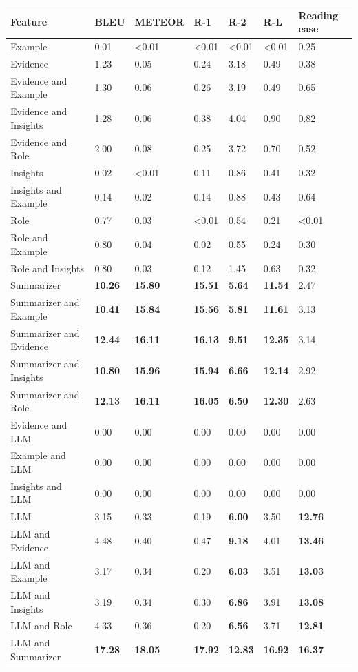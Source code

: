 \begin{tabular}{|l|l|l|l|l|l|l|}
\hline
\textbf{Feature} & BLEU & METEOR & R-1 & R-2 & R-L & Reading ease \\
 \hline
 Example & 0.01 & \textless{}0.01 & \textless{}0.01 & \textless{}0.01 & \textless{}0.01 & 0.25 \\
 \hline
 Evidence & 1.23 & 0.05 & 0.24 & 3.18 & 0.49 & 0.38 \\
 \hline
 Evidence and Example & 1.30 & 0.06 & 0.26 & 3.19 & 0.49 & 0.65 \\
 \hline
 Evidence and Insights & 1.28 & 0.06 & 0.38 & 4.04 & 0.90 & 0.82 \\
 \hline
 Evidence and Role & 2.00 & 0.08 & 0.25 & 3.72 & 0.70 & 0.52 \\
 \hline
 Insights & 0.02 & \textless{}0.01 & 0.11 & 0.86 & 0.41 & 0.32 \\
 \hline
 Insights and Example & 0.14 & 0.02 & 0.14 & 0.88 & 0.43 & 0.64 \\
 \hline
 Role & 0.77 & 0.03 & \textless{}0.01 & 0.54 & 0.21 & \textless{}0.01 \\
 \hline
 Role and Example & 0.80 & 0.04 & 0.02 & 0.55 & 0.24 & 0.30 \\
 \hline
 Role and Insights & 0.80 & 0.03 & 0.12 & 1.45 & 0.63 & 0.32 \\
 \hline
 Summarizer & \textbf{10.26} & \textbf{15.80} & \textbf{15.51} & \textbf{5.64} & \textbf{11.54} & 2.47 \\
 \hline
 Summarizer and Example & \textbf{10.41} & \textbf{15.84} & \textbf{15.56} & \textbf{5.81} & \textbf{11.61} & 3.13 \\
 \hline
 Summarizer and Evidence & \textbf{12.44} & \textbf{16.11} & \textbf{16.13} & \textbf{9.51} & \textbf{12.35} & 3.14 \\
 \hline
 Summarizer and Insights & \textbf{10.80} & \textbf{15.96} & \textbf{15.94} & \textbf{6.66} & \textbf{12.14} & 2.92 \\
 \hline
 Summarizer and Role & \textbf{12.13} & \textbf{16.11} & \textbf{16.05} & \textbf{6.50} & \textbf{12.30} & 2.63 \\
 \hline
 Evidence and LLM & 0.00 & 0.00 & 0.00 & 0.00 & 0.00 & 0.00 \\
 \hline
 Example and LLM & 0.00 & 0.00 & 0.00 & 0.00 & 0.00 & 0.00 \\
 \hline
 Insights and LLM & 0.00 & 0.00 & 0.00 & 0.00 & 0.00 & 0.00 \\
 \hline
 LLM & 3.15 & 0.33 & 0.19 & \textbf{6.00} & 3.50 & \textbf{12.76} \\
 \hline
 LLM and Evidence & 4.48 & 0.40 & 0.47 & \textbf{9.18} & 4.01 & \textbf{13.46} \\
 \hline
 LLM and Example & 3.17 & 0.34 & 0.20 & \textbf{6.03} & 3.51 & \textbf{13.03} \\
 \hline
 LLM and Insights & 3.19 & 0.34 & 0.30 & \textbf{6.86} & 3.91 & \textbf{13.08} \\
 \hline
 LLM and Role & 4.33 & 0.36 & 0.20 & \textbf{6.56} & 3.71 & \textbf{12.81} \\
 \hline
 LLM and Summarizer & \textbf{17.28} & \textbf{18.05} & \textbf{17.92} & \textbf{12.83} & \textbf{16.92} & \textbf{16.37} \\
\hline
\end{tabular}

